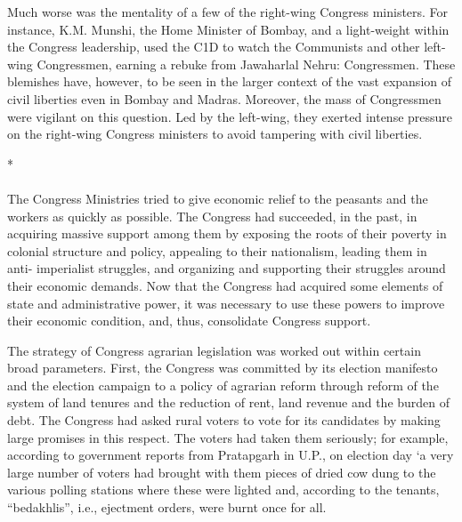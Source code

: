 \begin{multicols}{2}
Much worse was the mentality of a few of the right-wing Congress ministers. For instance, K.M. Munshi, the Home Minister of Bombay, and a light-weight within the Congress leadership, used the C1D to watch the Communists and other left-wing Congressmen, earning a rebuke from Jawaharlal Nehru: Congressmen. These blemishes have, however, to be seen in the larger context of the vast expansion of civil liberties even in Bombay and Madras. Moreover, the mass of Congressmen were vigilant on this question. Led by the left-wing, they exerted intense pressure on the right-wing Congress ministers to avoid tampering with civil liberties.

\begin{center}*\end{center}

\paragraph*{}

The Congress Ministries tried to give economic relief to the peasants and the workers as quickly as possible. The Congress had succeeded, in the past, in acquiring massive support among them by exposing the roots of their poverty in colonial structure and policy, appealing to their nationalism, leading them in anti- imperialist struggles, and organizing and supporting their struggles around their economic demands. Now that the Congress had acquired some elements of state and administrative power, it was necessary to use these powers to improve their economic condition, and, thus, consolidate Congress support. 

The strategy of Congress agrarian legislation was worked out within certain broad parameters. First, the Congress was committed by its election manifesto and the election campaign to a policy of agrarian reform through reform of the system of land tenures and the reduction of rent, land revenue and the burden of debt. The Congress had asked rural voters to vote for its candidates by making large promises in this respect. The voters had taken them seriously; for example, according to government reports from Pratapgarh in U.P., on election day `a very large number of voters had brought with them pieces of dried cow dung to the various polling stations where these were lighted and, according to the tenants, ``bedakhlis'', i.e., ejectment orders, were burnt once for all. 


\end{multicols}
